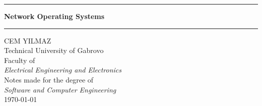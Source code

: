 \documentclass[a4paper, 12pt]{article}
\newcommand{\coloredrule}[2][tugblue]{%
  \textcolor{#1}{\rule{\linewidth}{#2}}%
}
\theoremstyle{plain}
\theoremstyle{definition}
\theoremstyle{remark}
\begin{document}
	\begin{titlepage}
	        \vspace*{0.8cm}
	        \begin{center}
	                \coloredrule{2pt}\par
	                \vskip 0.6cm
	                \textbf{\Huge Network Operating Systems}\par
	                \vskip 0.3cm
	                \coloredrule{2pt}\par
	
	                \vskip 3cm
	
	                
	
	                \vspace{3cm} %
	                \Large CEM YILMAZ \\
	                \Large Technical University of Gabrovo \\
	                \Large Faculty of \\
	                \Large\textit{Electrical Engineering and Electronics}\\
	
	                \vspace{2cm}
	                \Large Notes made for the degree of\\
	                \Large \textit{Software and Computer Engineering}\\
	                \Large \today \\
	                \vspace{0.5cm}
	
	                \vfill  %
	        \end{center}
	\end{titlepage}
	
	\tableofcontents
	\newpage
\end{document}
